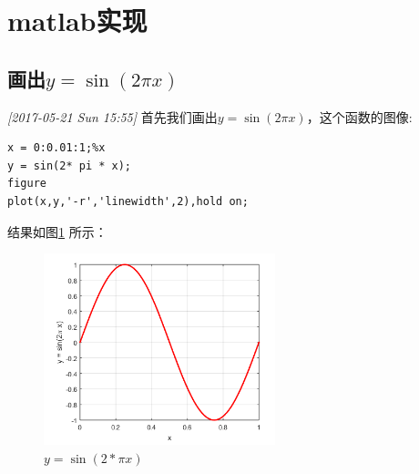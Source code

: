 \documentclass[10pt,a4paper,UTF8]{article}
\begin{document}
\section{matlab实现}
\label{sec:orgdcba2d5}

\subsection{画出\(y = \sin (2\pi x)\)}
\label{sec:orge19ee2a}
  \textit{[2017-05-21 Sun 15:55]}
首先我们画出\(y = \sin (2\pi x)\)，这个函数的图像:
\lstset{language=matlab,label= ,caption= ,captionpos=b,firstnumber=1,numbers=left}
\begin{lstlisting}
x = 0:0.01:1;%x
y = sin(2* pi * x);
figure
plot(x,y,'-r','linewidth',2),hold on;
\end{lstlisting}
结果如图\ref{fig:org46d6919} 所示：
\begin{figure}[htbp]
\centering
\includegraphics[width=0.6\textwidth]{../../img/computer_prml/20170521figure1.png}
\caption{\label{fig:org46d6919}
\(y = \sin(2*\pi x)\)}
\end{figure}
\end{document}
